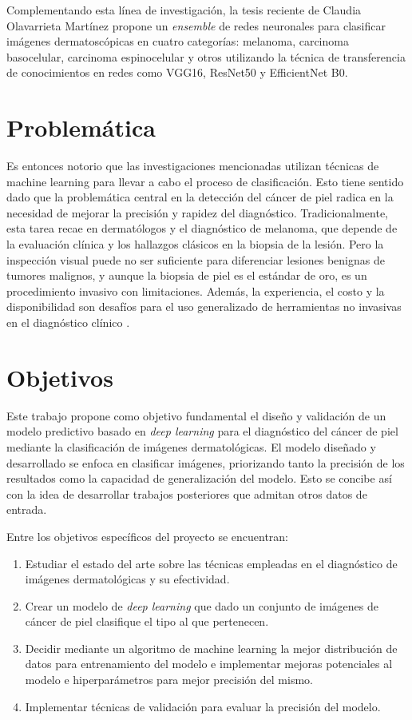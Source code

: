 Complementando esta línea de investigación, la tesis reciente de Claudia Olavarrieta Martínez  propone un \textit{ensemble} de redes neuronales para clasificar imágenes dermatoscópicas en cuatro categorías: melanoma, carcinoma basocelular, carcinoma espinocelular y otros utilizando la técnica de transferencia de conocimientos en redes como VGG16, ResNet50 y EfficientNet B0.

\section*{Problemática}

Es entonces notorio que las investigaciones mencionadas utilizan técnicas de machine learning para llevar a cabo el proceso de clasificación. Esto tiene sentido dado que la problemática central en la detección del cáncer de piel radica en la necesidad de mejorar la precisión y rapidez del diagnóstico. Tradicionalmente, esta tarea recae en dermatólogos y el diagnóstico de melanoma, que depende de la evaluación clínica y los hallazgos clásicos en la biopsia de la lesión. Pero la inspección visual puede no ser suficiente para diferenciar lesiones benignas de tumores malignos, y aunque la biopsia de piel es el estándar de oro, es un procedimiento invasivo con limitaciones. Además, la experiencia, el costo y la disponibilidad son desafíos para el uso generalizado de herramientas no invasivas en el diagnóstico clínico .

\section*{Objetivos}

Este trabajo propone como objetivo fundamental el diseño y validación de un modelo predictivo basado en \textit{deep learning} para el diagnóstico del cáncer de piel mediante la clasificación de imágenes dermatológicas. El modelo diseñado y desarrollado se enfoca en clasificar imágenes, priorizando tanto la precisión de los resultados como la capacidad de generalización del modelo. Esto se concibe así con la idea de desarrollar trabajos posteriores que admitan otros datos de entrada.

Entre los objetivos específicos del proyecto se encuentran:

\begin{enumerate}
    \item Estudiar el estado del arte sobre las técnicas empleadas en el diagnóstico de imágenes dermatológicas y su efectividad.
    \item Crear un modelo de \textit{deep learning} que dado un conjunto de imágenes de cáncer de piel clasifique el tipo al que pertenecen.
    \item Decidir mediante un algoritmo de machine learning la mejor distribución de datos para entrenamiento del modelo e implementar mejoras potenciales al modelo e hiperparámetros para mejor precisión del mismo.
    \item Implementar técnicas de validación para evaluar la precisión del modelo.
\end{enumerate}

